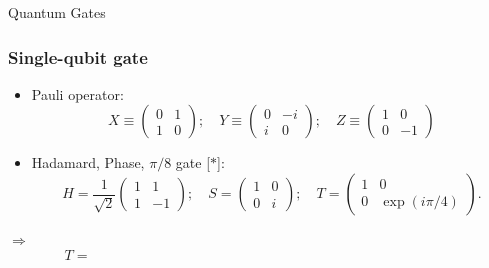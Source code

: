 \documentclass[9pt]{beamer}
\begin{document}
    \begin{section}{Quantum Gates}
        \begin{frame}
            \frametitle{Single-qubit gate}
                \begin{itemize}
                    \item Pauli operator:
                    $$
                    X \equiv\left(\begin{array}{cc}
                    0 & 1 \\
                    1 & 0
                    \end{array}\right) ; \quad Y \equiv\left(\begin{array}{cc}
                    0 & -i \\
                    i & 0
                    \end{array}\right); \quad Z \equiv\left(\begin{array}{cc}
                    1 & 0 \\
                    0 & -1
                    \end{array}\right)
                    $$
                    \item Hadamard, Phase, $\pi/8$ gate [$\ast$]:
                    $$
                    H=\frac{1}{\sqrt{2}}\left(\begin{array}{cc}
                    1 & 1 \\
                    1 & -1
                    \end{array}\right) ; \quad S=\left(\begin{array}{ll}
                    1 & 0 \\
                    0 & i
                    \end{array}\right); \quad T=\left(\begin{array}{cc}
                    1 & 0 \\
                    0 & \exp (i \pi / 4)
                    \end{array}\right) .
                    $$
                \end{itemize}
                \vspace{0.4cm}
                $\Rightarrow$
                \vspace{0.6cm}
                $$T = \qquad \qquad \qquad \qquad \qquad \qquad \qquad \qquad \qquad \qquad \qquad \qquad \qquad $$
                \vspace{1.2cm}
        \end{frame}


\end{section}
\end{document}

